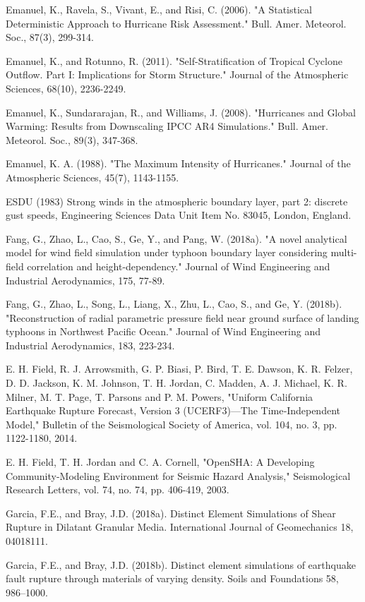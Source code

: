 Emanuel, K., Ravela, S., Vivant, E., and Risi, C. (2006). "A Statistical Deterministic Approach to Hurricane Risk Assessment." Bull. Amer. Meteorol. Soc., 87(3), 299-314.

Emanuel, K., and Rotunno, R. (2011). "Self-Stratification of Tropical Cyclone Outflow. Part I: Implications for Storm Structure." Journal of the Atmospheric Sciences, 68(10), 2236-2249.

Emanuel, K., Sundararajan, R., and Williams, J. (2008). "Hurricanes and Global Warming: Results from Downscaling IPCC AR4 Simulations." Bull. Amer. Meteorol. Soc., 89(3), 347-368.

Emanuel, K. A. (1988). "The Maximum Intensity of Hurricanes." Journal of the Atmospheric Sciences, 45(7), 1143-1155.

ESDU (1983) Strong winds in the atmospheric boundary layer, part 2: discrete gust speeds, Engineering Sciences Data Unit Item No. 83045, London, England.

Fang, G., Zhao, L., Cao, S., Ge, Y., and Pang, W. (2018a). "A novel analytical model for wind field simulation under typhoon boundary layer considering multi-field correlation and height-dependency." Journal of Wind Engineering and Industrial Aerodynamics, 175, 77-89.

Fang, G., Zhao, L., Song, L., Liang, X., Zhu, L., Cao, S., and Ge, Y. (2018b). "Reconstruction of radial parametric pressure field near ground surface of landing typhoons in Northwest Pacific Ocean." Journal of Wind Engineering and Industrial Aerodynamics, 183, 223-234.

E. H. Field, R. J. Arrowsmith, G. P. Biasi, P. Bird, T. E. Dawson, K. R. Felzer, D. D. Jackson, K. M. Johnson, T. H. Jordan, C. Madden, A. J. Michael, K. R. Milner, M. T. Page, T. Parsons and P. M. Powers, "Uniform California Earthquake Rupture Forecast, Version 3 (UCERF3)—The Time‐Independent Model," Bulletin of the Seismological Society of America, vol. 104, no. 3, pp. 1122-1180, 2014.

E. H. Field, T. H. Jordan and C. A. Cornell, "OpenSHA: A Developing Community-Modeling Environment for Seismic Hazard Analysis," Seismological Research Letters, vol. 74, no. 74, pp. 406-419, 2003.

Garcia, F.E., and Bray, J.D. (2018a). Distinct Element Simulations of Shear Rupture in Dilatant Granular Media. International Journal of Geomechanics 18, 04018111.

Garcia, F.E., and Bray, J.D. (2018b). Distinct element simulations of earthquake fault rupture through materials of varying density. Soils and Foundations 58, 986–1000.

